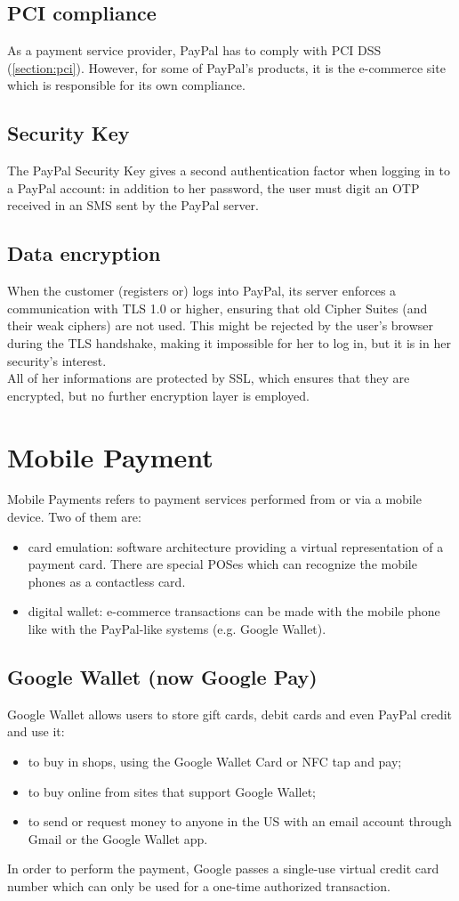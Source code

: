 \documentclass[a4paper, 10pt, titlepage]{article}
\begin{document}
\subsection{PCI compliance}
As a payment service provider, PayPal has to comply with PCI DSS (\ref{section:pci}). However, for some of PayPal's products, it is the e-commerce site which is responsible for its own compliance.

\subsection{Security Key}
The PayPal Security Key gives a second authentication factor when logging in to a PayPal account: in addition to her password, the user must digit an OTP received in an SMS sent by the PayPal server.

\subsection{Data encryption}
When the customer (registers or) logs into PayPal, its server enforces a communication with TLS 1.0 or higher, ensuring that old Cipher Suites (and their weak ciphers) are not used. This might be rejected by the user's browser during the TLS handshake, making it impossible for her to log in, but it is in her security's interest.\\
All of her informations are protected by SSL, which ensures that they are encrypted, but no further encryption layer is employed.

\section{Mobile Payment}
Mobile Payments refers to payment services performed from or via a mobile device. Two of them are:
\begin{itemize}
\item card emulation: software architecture providing a virtual representation of a payment card. There are special POSes which can recognize the mobile phones as a contactless card.
\item digital wallet: e-commerce transactions can be made with the mobile phone like with the PayPal-like systems (e.g. Google Wallet).
\end{itemize}

\subsection{Google Wallet (now Google Pay)}
Google Wallet allows users to store gift cards, debit cards and even PayPal credit and use it: 
\begin{itemize}
\item to buy in shops, using the Google Wallet Card or NFC tap and pay;
\item to buy online from sites that support Google Wallet;
\item to send or request money to anyone in the US with an email account through Gmail or the Google Wallet app.
\end{itemize}
In order to perform the payment, Google passes a single-use virtual credit card number which can only be used for a one-time authorized transaction.
\end{document}
